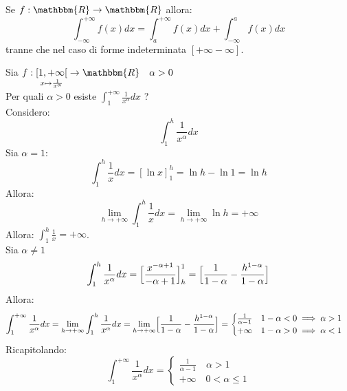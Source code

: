 \documentclass[12pt]{report}
\begin{document}
		Se $f: \mathbbm{R} \to \mathbbm{R}$ allora:
		\[
		\int_{-\infty}^{+\infty}f(x)dx = \int_{a}^{+\infty}f(x)dx + \int_{-\infty}^{a}f(x)dx
		\]
		tranne che nel caso di forme indeterminata $[+\infty-\infty]$. \\
		\begin{example}{}{}
			Sia $f: \underset{x \mapsto \frac{1}{x^\alpha}}{[1, +\infty[} \to \mathbbm{R} \quad \alpha > 0$ \\
			Per quali $\alpha > 0$ esiste $\int_{1}^{+\infty}\frac{1}{x^\alpha}dx$ ? \\
			Considero:
			\[
			\int_{1}^{h}\frac{1}{x^\alpha}dx
			\]
			Sia $\alpha = 1$:
			\[
			\int_{1}^{h}\frac{1}{x}dx = [\ln x]^h_1 = \ln h - \ln 1 = \ln h
			\]
			Allora:
			\[
			\lim_{h \to +\infty}\int_{1}^{h}\frac{1}{x}dx = \lim_{h \to +\infty}\ln h = +\infty
			\]
			Allora: $\int_{1}^{h}\frac{1}{x} = +\infty$. \\
			Sia $\alpha \neq 1$ \\
			\[
			\int_{1}^{h}\frac{1}{x^\alpha}dx = \Bigl[ \frac{x^{-\alpha + 1}}{-\alpha + 1}\Bigr]^{1}_h = \Bigl[ \frac{1}{1-\alpha} - \frac{h^{1 - \alpha}}{1 -\alpha}\Bigr]
			\]
			Allora:
			\[
			\int_{1}^{+\infty}\frac{1}{x^\alpha}dx = \lim_{h \to +\infty}\int_{1}^{h}\frac{1}{x^\alpha}dx = \lim_{h \to +\infty}\Bigl[ \frac{1}{1-\alpha} - \frac{h^{1 - \alpha}}{1 -\alpha}\Bigr] = \begin{cases}
				\frac{1}{\alpha - 1} \quad 1 - \alpha<0 \implies \alpha > 1\\
				+\infty \quad 1-\alpha > 0 \implies \alpha < 1
			\end{cases}
			\]
			Ricapitolando:
			\[
			\int_{1}^{+\infty}\frac{1}{x^\alpha}dx = \begin{cases}
				\frac{1}{\alpha - 1} \quad \alpha > 1 \\
				+\infty \quad 0 < \alpha \leq 1
			\end{cases}
			\]
		\end{example}
\end{document}
